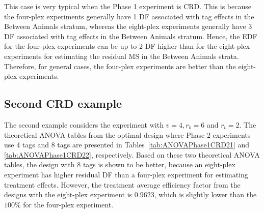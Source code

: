 \documentclass[12pt,a4paper]{article}
\begin{document}
This case is very typical when the Phase 1 experiment is CRD. This is because the four-plex experiments generally have 1 DF associated with tag effects in the Between Animals stratum, whereas the eight-plex experiments generally have 3 DF associated with tag effects in the Between Animals stratum. Hence, the EDF for the four-plex experiments can be up to 2 DF higher than for the eight-plex experiments for estimating the residual MS in the Between Animals strata. Therefore, for general cases, the four-plex experiments are better than the eight-plex experiments.


\subsection{Second CRD example}
The second example considers the experiment with $v = 4, r_b = 6$ and $r_t = 2$. The theoretical ANOVA tables from the optimal design where Phase 2 experiments use 4 tags and 8 tags are presented in Tables~\ref{tab:ANOVAPhase1CRD21} and \ref{tab:ANOVAPhase1CRD22}, respectively. 
Based on these two theoretical ANOVA tables, the design with 8 tags is shown to be better, because an eight-plex experiment has higher residual DF than a four-plex experiment for estimating treatment effects. However, the treatment average efficiency factor from the designs with the eight-plex experiment is $0.9623$, which is slightly lower than the $100\%$ for the four-plex experiment.  
\end{document}
